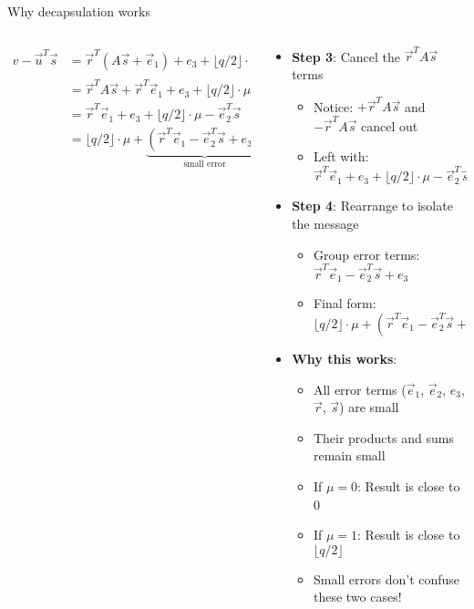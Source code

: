\documentclass[aspectratio=169, lualatex, handout]{beamer}
\begin{document}
\begin{frame}{Why decapsulation works}
	\begin{columns}[c]
		\begin{column}{0.4\textwidth}
			\tiny
			\begin{align*}
				v - \vec{u}^T\vec{s} & = \vec{r}^{T}(A\vec{s} + \vec{e}_1) + e_3 + \lfloor q/2 \rfloor \cdot \mu - (\vec{r}^{T}A + \vec{e}_{2}^{T})\vec{s}               \\
				                     & = \vec{r}^{T}A\vec{s} + \vec{r}^{T}\vec{e}_1 + e_3 + \lfloor q/2 \rfloor \cdot \mu - \vec{r}^{T}A\vec{s} - \vec{e}_{2}^{T}\vec{s} \\
				                     & = \vec{r}^{T}\vec{e}_{1} + e_3 + \lfloor q/2 \rfloor \cdot \mu - \vec{e}_{2}^{T}\vec{s}                                           \\
				                     & = \lfloor q/2 \rfloor \cdot \mu + \underbrace{(\vec{r}^{T}\vec{e}_{1} - \vec{e}_{2}^{T}\vec{s} + e_3)}_{\text{small error}}
			\end{align*}
		\end{column}
		\begin{column}{0.6\textwidth}
			\begin{itemize}
				\item \textbf{Step 3}: Cancel the $\vec{r}^TA\vec{s}$ terms
				      \begin{itemize}
					      \item Notice: $+\vec{r}^TA\vec{s}$ and $-\vec{r}^TA\vec{s}$ cancel out
					      \item Left with: $\vec{r}^T\vec{e}_1 + e_3 + \lfloor q/2 \rfloor \cdot \mu - \vec{e}_2^T\vec{s}$
				      \end{itemize}
				\item \textbf{Step 4}: Rearrange to isolate the message
				      \begin{itemize}
					      \item Group error terms: $\vec{r}^T\vec{e}_1 - \vec{e}_2^T\vec{s} + e_3$
					      \item Final form: $\lfloor q/2 \rfloor \cdot \mu + (\vec{r}^T\vec{e}_1 - \vec{e}_2^T\vec{s} + e_3)$
				      \end{itemize}
				\item \textbf{Why this works}:
				      \begin{itemize}
					      \item All error terms ($\vec{e}_1$, $\vec{e}_2$, $e_3$, $\vec{r}$, $\vec{s}$) are small
					      \item Their products and sums remain small
					      \item If $\mu = 0$: Result is close to 0
					      \item If $\mu = 1$: Result is close to $\lfloor q/2 \rfloor$
					      \item Small errors don't confuse these two cases!
				      \end{itemize}
			\end{itemize}
		\end{column}
	\end{columns}
\end{frame}
\end{document}
